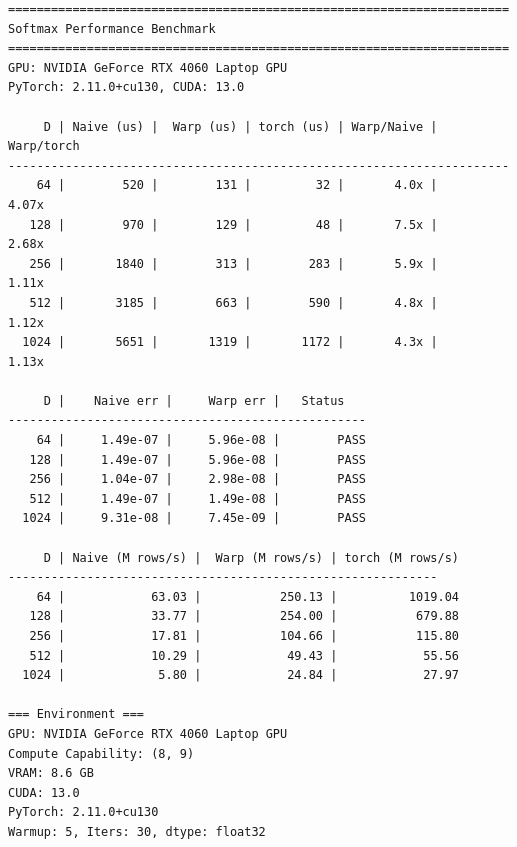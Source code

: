 \documentclass[12pt,a4paper]{ctexart}
\begin{document}
\begin{lstlisting}[style=shell, caption={benchmark.py 完整输出}]
======================================================================
Softmax Performance Benchmark
======================================================================
GPU: NVIDIA GeForce RTX 4060 Laptop GPU
PyTorch: 2.11.0+cu130, CUDA: 13.0

     D | Naive (us) |  Warp (us) | torch (us) | Warp/Naive | Warp/torch
----------------------------------------------------------------------
    64 |        520 |        131 |         32 |       4.0x |      4.07x
   128 |        970 |        129 |         48 |       7.5x |      2.68x
   256 |       1840 |        313 |        283 |       5.9x |      1.11x
   512 |       3185 |        663 |        590 |       4.8x |      1.12x
  1024 |       5651 |       1319 |       1172 |       4.3x |      1.13x

     D |    Naive err |     Warp err |   Status
--------------------------------------------------
    64 |     1.49e-07 |     5.96e-08 |        PASS
   128 |     1.49e-07 |     5.96e-08 |        PASS
   256 |     1.04e-07 |     2.98e-08 |        PASS
   512 |     1.49e-07 |     1.49e-08 |        PASS
  1024 |     9.31e-08 |     7.45e-09 |        PASS

     D | Naive (M rows/s) |  Warp (M rows/s) | torch (M rows/s)
------------------------------------------------------------
    64 |            63.03 |           250.13 |          1019.04
   128 |            33.77 |           254.00 |           679.88
   256 |            17.81 |           104.66 |           115.80
   512 |            10.29 |            49.43 |            55.56
  1024 |             5.80 |            24.84 |            27.97

=== Environment ===
GPU: NVIDIA GeForce RTX 4060 Laptop GPU
Compute Capability: (8, 9)
VRAM: 8.6 GB
CUDA: 13.0
PyTorch: 2.11.0+cu130
Warmup: 5, Iters: 30, dtype: float32
\end{lstlisting}
\end{document}

